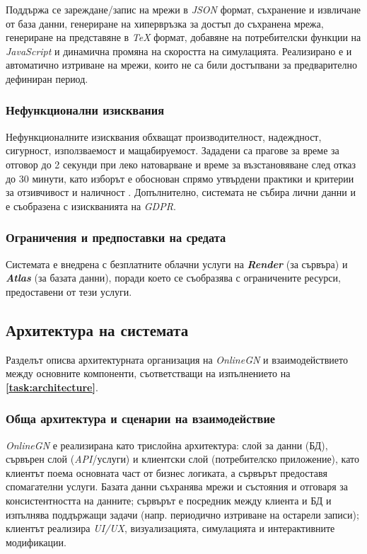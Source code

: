 Поддържа се зареждане/запис на мрежи в \textit{JSON} формат, съхранение и извличане от база данни, генериране на хипервръзка за достъп до съхранена мрежа, генериране на представяне в \textit{TeX} формат, добавяне на потребителски функции на \textit{JavaScript} и динамична промяна на скоростта на симулацията. Реализирано е и автоматично изтриване на мрежи, които не са били достъпвани за предварително дефиниран период.

\subsubsection{Нефункционални изисквания}
\hspace*{2.5em}Нефункционалните изисквания обхващат производителност, надеждност, сигурност, използваемост и мащабируемост. Зададени са прагове за време за отговор до 2 секунди при леко натоварване и време за възстановяване след отказ до 30 минути, като изборът е обоснован спрямо утвърдени практики и критерии за отзивчивост и наличност \cite{DIS-Nielsen1993RT}. Допълнително, системата не събира лични данни и е съобразена с изискванията на \textit{GDPR}.

\subsubsection{Ограничения и предпоставки на средата}
\hspace*{2.5em}Системата е внедрена с безплатните облачни услуги на \textbf{\textit{Render}} (за сървъра) и \textbf{\textit{Atlas}} (за базата данни), поради което се съобразява с ограничените ресурси, предоставени от тези услуги.

\subsection{Архитектура на системата}

\hspace*{2.5em}Разделът описва архитектурната организация на \textit{OnlineGN} и взаимодействието между основните компоненти, съответстващи на изпълнението на \textbf{\ref{task:architecture}}.

\subsubsection{Обща архитектура и сценарии на взаимодействие}
\hspace*{2.5em}\textit{OnlineGN} е реализирана като трислойна архитектура: слой за данни (БД), сървърен слой (\textit{API}/услуги) и клиентски слой (потребителско приложение), като клиентът поема основната част от бизнес логиката, а сървърът предоставя спомагателни услуги. Базата данни съхранява мрежи и състояния и отговаря за консистентността на данните; сървърът е посредник между клиента и БД и изпълнява поддържащи задачи (напр. периодично изтриване на остарели записи); клиентът реализира \textit{UI/UX}, визуализацията, симулацията и интерактивните модификации.

